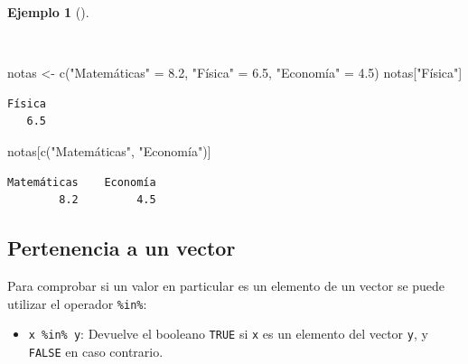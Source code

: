 \documentclass[
  a4paper,
]{scrreport}
\newenvironment{Shaded}{\begin{snugshade}}{\end{snugshade}}
\newcommand{\FloatTok}[1]{\textcolor[rgb]{0.68,0.00,0.00}{#1}}
\newcommand{\FunctionTok}[1]{\textcolor[rgb]{0.28,0.35,0.67}{#1}}
\newcommand{\NormalTok}[1]{\textcolor[rgb]{0.00,0.23,0.31}{#1}}
\newcommand{\OtherTok}[1]{\textcolor[rgb]{0.00,0.23,0.31}{#1}}
\newcommand{\StringTok}[1]{\textcolor[rgb]{0.13,0.47,0.30}{#1}}
\providecommand{\tightlist}{%
  \setlength{\itemsep}{0pt}\setlength{\parskip}{0pt}}\usepackage{longtable,booktabs,array}
\theoremstyle{definition}
\theoremstyle{definition}
\newtheorem{example}{Ejemplo}[chapter]
\theoremstyle{remark}
\begin{document}
\begin{example}[]\protect\hypertarget{exm-acceso-vector-nombres}{}\label{exm-acceso-vector-nombres}

~

\begin{Shaded}
\begin{Highlighting}[]
\NormalTok{notas }\OtherTok{\textless{}{-}} \FunctionTok{c}\NormalTok{(}\StringTok{"Matemáticas"} \OtherTok{=} \FloatTok{8.2}\NormalTok{, }\StringTok{"Física"} \OtherTok{=} \FloatTok{6.5}\NormalTok{, }\StringTok{"Economía"} \OtherTok{=} \FloatTok{4.5}\NormalTok{)}
\NormalTok{notas[}\StringTok{"Física"}\NormalTok{]}
\end{Highlighting}
\end{Shaded}

\begin{verbatim}
Física 
   6.5 
\end{verbatim}

\begin{Shaded}
\begin{Highlighting}[]
\NormalTok{notas[}\FunctionTok{c}\NormalTok{(}\StringTok{"Matemáticas"}\NormalTok{, }\StringTok{"Economía"}\NormalTok{)]}
\end{Highlighting}
\end{Shaded}

\begin{verbatim}
Matemáticas    Economía 
        8.2         4.5 
\end{verbatim}

\end{example}

\hypertarget{pertenencia-a-un-vector}{%
\subsection{Pertenencia a un vector}\label{pertenencia-a-un-vector}}

Para comprobar si un valor en particular es un elemento de un vector se
puede utilizar el operador \texttt{\%in\%}:

\begin{itemize}
\tightlist
\item
  \texttt{x\ \%in\%\ y}: Devuelve el booleano \texttt{TRUE} si
  \texttt{x} es un elemento del vector \texttt{y}, y \texttt{FALSE} en
  caso contrario.
\end{itemize}
\end{document}

